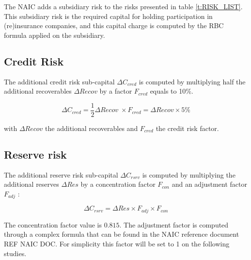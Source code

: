 The NAIC adds a subsidiary risk to the risks presented in table \ref{t:RISK_LIST}. This subsidiary risk is the required capital for holding participation in (re)insurance companies, and this capital charge is computed by the RBC formula applied on the subsidiary. 

\subsection{Credit Risk}

The additional credit risk sub-capital $\Delta C_{cred}$ is computed by multiplying half the additional recoverables $\Delta Recov$ by a factor $F_{cred}$ equals to 10\%. 

\begin{equation}
	\Delta C_{cred} = \frac{1}{2}\Delta Recov \; \times F_{cred} = \Delta Recov \times 5\%
\end{equation}

with $\Delta Recov$ the additional recoverables and $F_{cred}$ the credit risk factor.


\subsection{Reserve risk}

The additional reserve risk sub-capital $\Delta C_{rsrv}$ is computed by multiplying the additional reserves $\Delta Res$ by a concentration factor $F_{con}$ and an adjustment factor $F_{adj}$ :

\begin{equation}
	\Delta C_{rsrv} = \Delta Res \times F_{adj} \times F_{con}
\end{equation}

The concentration factor value is $0.815$. The adjustment factor is computed through a complex formula that can be found in the NAIC reference document REF NAIC DOC. For simplicity this factor will be set to 1 on the following studies.



